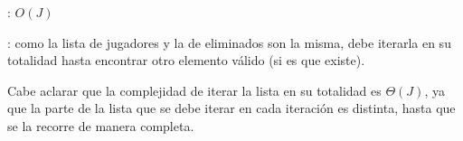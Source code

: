 \begin{Algoritmos}
	\complejidad: $O(J)$

	\justifcomp: como la lista de jugadores y la de eliminados son la misma, debe iterarla en su totalidad hasta encontrar otro elemento válido (si es que existe).

	Cabe aclarar que la complejidad de iterar la lista en su totalidad es $\Theta(J)$, ya que la parte de la lista que se debe iterar en cada iteración es distinta, hasta que se la recorre de manera completa.

\end{Algoritmos}
